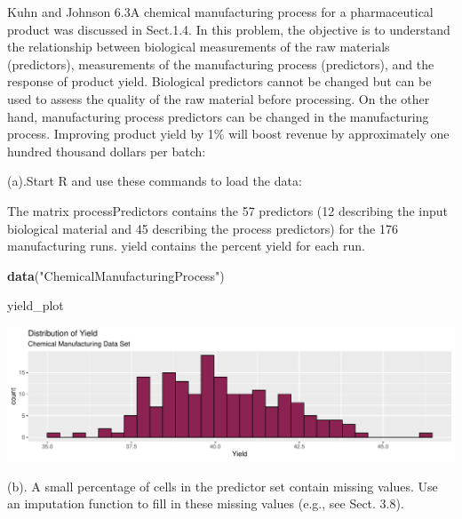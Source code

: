 \documentclass[]{report}
\newenvironment{Shaded}{\begin{snugshade}}{\end{snugshade}}
\newcommand{\KeywordTok}[1]{\textcolor[rgb]{0.13,0.29,0.53}{\textbf{#1}}}
\newcommand{\NormalTok}[1]{#1}
\newcommand{\StringTok}[1]{\textcolor[rgb]{0.31,0.60,0.02}{#1}}
\begin{document}
\begin{question}{Kuhn and Johnson 6.3}A chemical manufacturing process for a pharmaceutical product was discussed in Sect.1.4. In this problem, the objective is to understand the relationship between biological measurements of the raw materials (predictors), measurements of the manufacturing process (predictors), and the response of product yield. Biological predictors cannot be changed but can be used to assess the quality of the raw material before processing. On the other hand, manufacturing process predictors can be changed in the manufacturing process. Improving product yield by 1\% will boost revenue by approximately one hundred thousand dollars per batch:\end{question}

\begin{subquestion}{(a).}Start R and use these commands to load the data:
\end{subquestion}

The matrix processPredictors contains the 57 predictors (12 describing
the input biological material and 45 describing the process predictors)
for the 176 manufacturing runs. yield contains the percent yield for
each run.

\begin{Shaded}
\begin{Highlighting}[]
\KeywordTok{data}\NormalTok{(}\StringTok{"ChemicalManufacturingProcess"}\NormalTok{)}

\NormalTok{yield_plot}
\end{Highlighting}
\end{Shaded}

\includegraphics{Homework-Two_files/figure-latex/kj-6.3a-1.pdf}

\begin{subquestion}{(b).} A small percentage of cells in the predictor set contain missing values. Use an imputation function to fill in these missing values (e.g., see Sect. 3.8). 
\end{subquestion}
\end{document}

